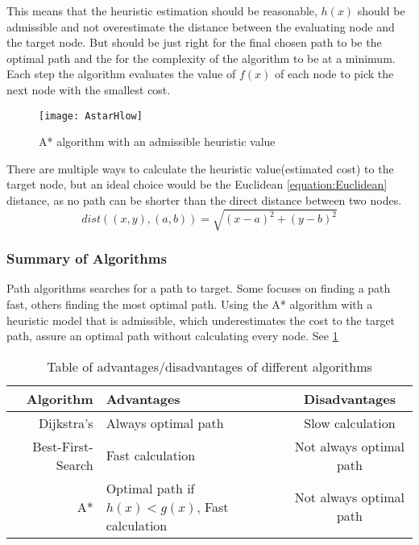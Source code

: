   This means that the heuristic estimation should be reasonable, $h(x)$ should be admissible and not overestimate the distance between the evaluating node and the target node. But should be just right for the final chosen path to be the optimal path and the for the complexity of the algorithm to be at a minimum. Each step the algorithm evaluates the value of $f(x)$ of each node to pick the next node with the smallest cost.

  \begin{figure}[ht!]
    \centering
    \texttt{[image: AstarHlow]}
    \caption{A* algorithm with an admissible heuristic value}
    \label{astar}
  \end{figure}

  There are multiple ways to calculate the heuristic value(estimated cost) to the target node, but an ideal choice would be the Euclidean \cref{equation:Euclidean} distance, as no path can be shorter than the direct distance between two nodes.
  \begin{equation} \label{equation:Euclidean}
    dist((x, y), (a, b)) = \sqrt{(x - a)^2 + (y - b)^2}
  \end{equation}

  \subsubsection{Summary of Algorithms}

  Path algorithms searches for a path to target. Some focuses on finding a path fast, others finding the most optimal path. Using the A* algorithm with a heuristic model that is admissible, which underestimates the cost to the target path, assure an optimal path without calculating every node. See \cref{tbl:scheme}
  
  \begin{table}[ht!]
    \centering
    \begin{tabular}{|r|l|c|}
      \hline
      \textbf{Algorithm} & \textbf{Advantages} & \textbf{Disadvantages} \\
      \hline
      Dijkstra's & Always optimal path & Slow calculation \\
      Best-First-Search & Fast calculation & Not always optimal path \\
      A* & Optimal path if $h(x)<g(x)$, Fast calculation & Not always optimal path \\
      \hline
    \end{tabular}
    \caption{Table of advantages/disadvantages of different algorithms}
    \label{tbl:scheme}
  \end{table}